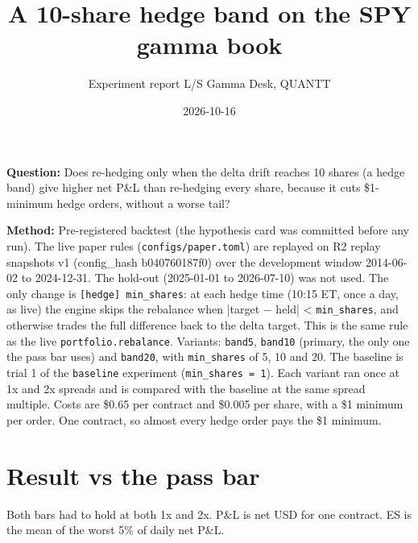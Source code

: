 \documentclass{article}
\title{A 10-share hedge band on the SPY gamma book}
\author{Experiment report \textperiodcentered{} L/S Gamma Desk, QUANTT}
\date{2026-10-16}
\begin{document}
\maketitle

\textbf{Question:} Does re-hedging only when the delta drift reaches 10 shares (a hedge band) give higher net P\&L than re-hedging every share, because it cuts \$1-minimum hedge orders, without a worse tail?

\textbf{Method:} Pre-registered backtest (the hypothesis card was committed before any run). The live paper rules (\texttt{configs/\allowbreak{}paper.\allowbreak{}toml}) are replayed on R2 replay snapshots v1 (config\_hash b040760187f0) over the development window 2014-06-02 to 2024-12-31. The hold-out (2025-01-01 to 2026-07-10) was not used. The only change is \texttt{[hedge] min\_\allowbreak{}shares}: at each hedge time (10:15 ET, once a day, as live) the engine skips the rebalance when |target \ensuremath{-} held| < \texttt{min\_\allowbreak{}shares}, and otherwise trades the full difference back to the delta target. This is the same rule as the live \texttt{portfolio.\allowbreak{}rebalance}. Variants: \texttt{band5}, \texttt{band10} (primary, the only one the pass bar uses) and \texttt{band20}, with \texttt{min\_\allowbreak{}shares} of 5, 10 and 20. The baseline is trial 1 of the \texttt{baseline} experiment (\texttt{min\_\allowbreak{}shares = 1}). Each variant ran once at 1x and 2x spreads and is compared with the baseline at the same spread multiple. Costs are \$0.65 per contract and \$0.005 per share, with a \$1 minimum per order. One contract, so almost every hedge order pays the \$1 minimum.

\section{Result vs the pass bar}

Both bars had to hold at both 1x and 2x. P\&L is net USD for one contract. ES is the mean of the worst 5\% of daily net P\&L.
\end{document}
